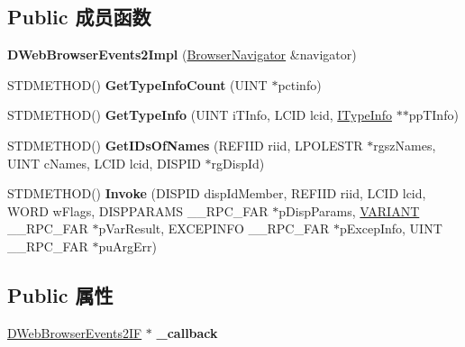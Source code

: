 \subsection*{Public 成员函数}
\begin{DoxyCompactItemize}
\item 
\mbox{\label{struct_d_web_browser_events2_impl_adc4e638c6dbcfb0f4a66459dfbc9673b}} 
{\bfseries D\+Web\+Browser\+Events2\+Impl} (\hyperlink{struct_browser_navigator}{Browser\+Navigator} \&navigator)
\item 
\mbox{\label{struct_d_web_browser_events2_impl_a2f3e793fcab920a9654e93d411b15590}} 
S\+T\+D\+M\+E\+T\+H\+OD() {\bfseries Get\+Type\+Info\+Count} (U\+I\+NT $\ast$pctinfo)
\item 
\mbox{\label{struct_d_web_browser_events2_impl_ae1141732e7d6312c25df498081d0c6fd}} 
S\+T\+D\+M\+E\+T\+H\+OD() {\bfseries Get\+Type\+Info} (U\+I\+NT i\+T\+Info, L\+C\+ID lcid, \hyperlink{interface_i_type_info}{I\+Type\+Info} $\ast$$\ast$pp\+T\+Info)
\item 
\mbox{\label{struct_d_web_browser_events2_impl_a6c89276df3a30e593a82879110cd8fb2}} 
S\+T\+D\+M\+E\+T\+H\+OD() {\bfseries Get\+I\+Ds\+Of\+Names} (R\+E\+F\+I\+ID riid, L\+P\+O\+L\+E\+S\+TR $\ast$rgsz\+Names, U\+I\+NT c\+Names, L\+C\+ID lcid, D\+I\+S\+P\+ID $\ast$rg\+Disp\+Id)
\item 
\mbox{\label{struct_d_web_browser_events2_impl_a81995b082e21d1c7ef9094a61a9c37d2}} 
S\+T\+D\+M\+E\+T\+H\+OD() {\bfseries Invoke} (D\+I\+S\+P\+ID disp\+Id\+Member, R\+E\+F\+I\+ID riid, L\+C\+ID lcid, W\+O\+RD w\+Flags, D\+I\+S\+P\+P\+A\+R\+A\+MS \+\_\+\+\_\+\+R\+P\+C\+\_\+\+F\+AR $\ast$p\+Disp\+Params, \hyperlink{structtag_v_a_r_i_a_n_t}{V\+A\+R\+I\+A\+NT} \+\_\+\+\_\+\+R\+P\+C\+\_\+\+F\+AR $\ast$p\+Var\+Result, E\+X\+C\+E\+P\+I\+N\+FO \+\_\+\+\_\+\+R\+P\+C\+\_\+\+F\+AR $\ast$p\+Excep\+Info, U\+I\+NT \+\_\+\+\_\+\+R\+P\+C\+\_\+\+F\+AR $\ast$pu\+Arg\+Err)
\end{DoxyCompactItemize}
\subsection*{Public 属性}
\begin{DoxyCompactItemize}
\item 
\mbox{\label{struct_d_web_browser_events2_impl_a19c8af17250eaccdebec6becc13fdf47}} 
\hyperlink{struct_d_web_browser_events2_i_f}{D\+Web\+Browser\+Events2\+IF} $\ast$ {\bfseries \+\_\+callback}
\end{DoxyCompactItemize}
